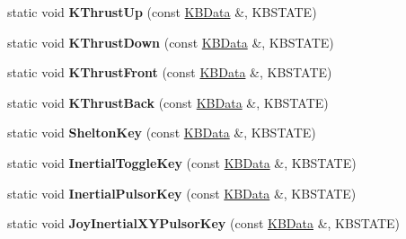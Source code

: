 \begin{DoxyCompactItemize}
\item 
static void {\bfseries K\+Thrust\+Up} (const \hyperlink{classKBData}{K\+B\+Data} \&, K\+B\+S\+T\+A\+TE)\hypertarget{classFlyByKeyboard_a3a7c4e92799992a4c151dd30e9dd2c26}{}\label{classFlyByKeyboard_a3a7c4e92799992a4c151dd30e9dd2c26}

\item 
static void {\bfseries K\+Thrust\+Down} (const \hyperlink{classKBData}{K\+B\+Data} \&, K\+B\+S\+T\+A\+TE)\hypertarget{classFlyByKeyboard_a8c18bcf200bf9bcbc30bbe63f3b33d3e}{}\label{classFlyByKeyboard_a8c18bcf200bf9bcbc30bbe63f3b33d3e}

\item 
static void {\bfseries K\+Thrust\+Front} (const \hyperlink{classKBData}{K\+B\+Data} \&, K\+B\+S\+T\+A\+TE)\hypertarget{classFlyByKeyboard_ab6577c5312469cd25875ddf3dd8b5270}{}\label{classFlyByKeyboard_ab6577c5312469cd25875ddf3dd8b5270}

\item 
static void {\bfseries K\+Thrust\+Back} (const \hyperlink{classKBData}{K\+B\+Data} \&, K\+B\+S\+T\+A\+TE)\hypertarget{classFlyByKeyboard_a4fb33c8910bcf08486f10144b3905ce3}{}\label{classFlyByKeyboard_a4fb33c8910bcf08486f10144b3905ce3}

\item 
static void {\bfseries Shelton\+Key} (const \hyperlink{classKBData}{K\+B\+Data} \&, K\+B\+S\+T\+A\+TE)\hypertarget{classFlyByKeyboard_a62ad0e0a8534bf1a50a911454d864f6d}{}\label{classFlyByKeyboard_a62ad0e0a8534bf1a50a911454d864f6d}

\item 
static void {\bfseries Inertial\+Toggle\+Key} (const \hyperlink{classKBData}{K\+B\+Data} \&, K\+B\+S\+T\+A\+TE)\hypertarget{classFlyByKeyboard_a6f6e9c13739ea213ea6cf3011fe103a3}{}\label{classFlyByKeyboard_a6f6e9c13739ea213ea6cf3011fe103a3}

\item 
static void {\bfseries Inertial\+Pulsor\+Key} (const \hyperlink{classKBData}{K\+B\+Data} \&, K\+B\+S\+T\+A\+TE)\hypertarget{classFlyByKeyboard_aee1865ac49a87e6851fdd4bd27d7cd29}{}\label{classFlyByKeyboard_aee1865ac49a87e6851fdd4bd27d7cd29}

\item 
static void {\bfseries Joy\+Inertial\+X\+Y\+Pulsor\+Key} (const \hyperlink{classKBData}{K\+B\+Data} \&, K\+B\+S\+T\+A\+TE)\hypertarget{classFlyByKeyboard_a83af90adce1351b009fe4ff78f3bb3c2}{}\label{classFlyByKeyboard_a83af90adce1351b009fe4ff78f3bb3c2}


\end{DoxyCompactItemize}
